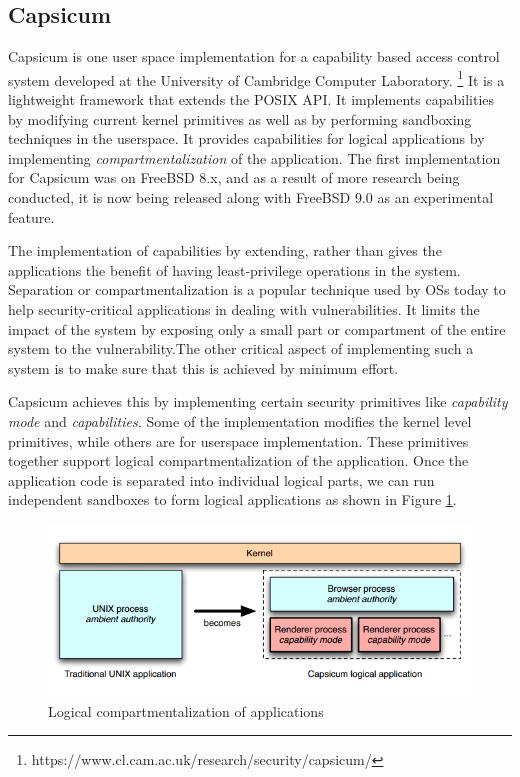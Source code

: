 \subsection{Capsicum}
\label{subsec:capsicum}

Capsicum is one user space implementation for a capability based access control system developed at the University of Cambridge Computer Laboratory. \footnote{https://www.cl.cam.ac.uk/research/security/capsicum/} It is a lightweight framework that extends the POSIX API. It implements capabilities by modifying current kernel primitives as well as by performing sandboxing techniques in the userspace. It provides capabilities for logical applications by implementing \textit{compartmentalization} of the application. The first implementation for Capsicum was on FreeBSD 8.x, and as a result of more research being conducted, it is now being released along with FreeBSD 9.0 as an experimental feature.

The implementation of capabilities by extending, rather than gives the applications the benefit of having least-privilege operations in the system. Separation or compartmentalization is a popular technique used by OSs today to help security-critical applications in dealing with vulnerabilities. It limits the impact of the system by exposing only a small part or compartment of the entire system to the vulnerability.The other critical aspect of implementing such a system is to make sure that this is achieved by minimum effort.

Capsicum achieves this by implementing certain security primitives like \textit{capability mode} and \textit{capabilities.} Some of the implementation modifies the kernel level primitives, while others are for userspace implementation. These primitives together support logical compartmentalization of the application. Once the application code is separated into individual logical parts, we can run independent sandboxes to form logical applications as shown in Figure \ref{compartment}.

\begin{figure}[h]
\centering
\includegraphics[scale=0.45]{img/capcisum_sandbox}
\caption{Logical compartmentalization of applications}
\label{compartment}
\end{figure}

